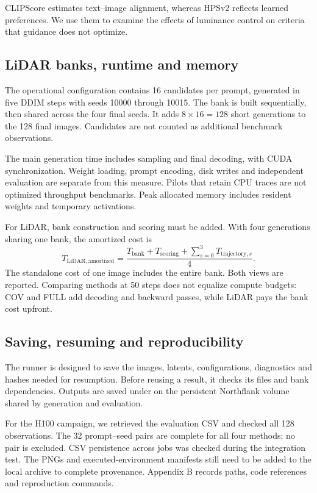 \documentclass[11pt,a4paper]{article}
\newcommand{\code}[1]{\texttt{\detokenize{#1}}}
\begin{document}
CLIPScore estimates text--image alignment, whereas HPSv2 reflects learned preferences. We use them to examine the effects of luminance control on criteria that guidance does not optimize.

\subsection{LiDAR banks, runtime and memory}
The operational configuration contains 16 candidates per prompt, generated in five DDIM steps with seeds 10000 through 10015. The bank is built sequentially, then shared across the four final seeds. It adds $8\times16=128$ short generations to the 128 final images. Candidates are not counted as additional benchmark observations.

The main generation time includes sampling and final decoding, with CUDA synchronization. Weight loading, prompt encoding, disk writes and independent evaluation are separate from this measure. Pilots that retain CPU traces are not optimized throughput benchmarks. Peak allocated memory includes resident weights and temporary activations.

For LiDAR, bank construction and scoring must be added. With four generations sharing one bank, the amortized cost is
\begin{equation}\label{eq:cost}
T_{\mathrm{LiDAR,amortized}}=
\frac{T_{\mathrm{bank}}+T_{\mathrm{scoring}}+\sum_{s=0}^{3}T_{\mathrm{trajectory},s}}{4}.
\end{equation}
The standalone cost of one image includes the entire bank. Both views are reported. Comparing methods at 50 steps does not equalize compute budgets: COV and FULL add decoding and backward passes, while LiDAR pays the bank cost upfront.

\subsection{Saving, resuming and reproducibility}
The runner is designed to save the images, latents, configurations, diagnostics and hashes needed for resumption. Before reusing a result, it checks its files and bank dependencies. Outputs are saved under \code{/data} on the persistent Northflank volume shared by generation and evaluation.

For the H100 campaign, we retrieved the evaluation CSV and checked all 128 observations. The 32 prompt--seed pairs are complete for all four methods; no pair is excluded. CSV persistence across jobs was checked during the integration test. The PNGs and executed-environment manifests still need to be added to the local archive to complete provenance. Appendix B records paths, code references and reproduction commands.
\end{document}
